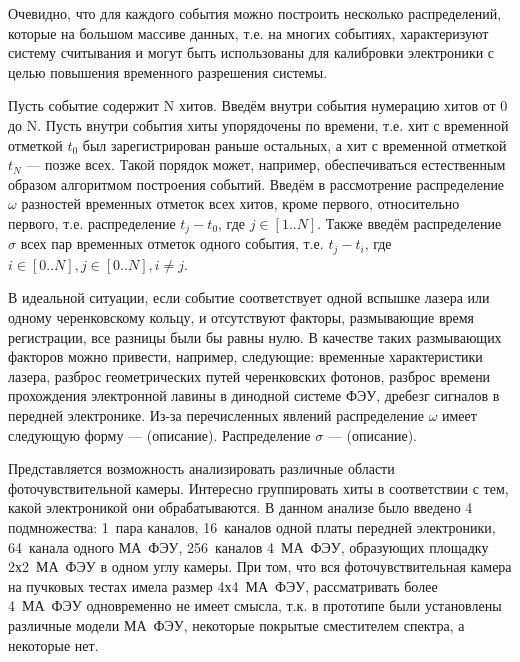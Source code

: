 Очевидно, что для каждого события можно построить несколько распределений, которые на большом массиве данных, т.е. на многих событиях, характеризуют систему считывания и могут быть использованы для калибровки электроники с целью повышения временного разрешения системы.

Пусть событие содержит N хитов. Введём внутри события нумерацию хитов от 0 до N. Пусть внутри события хиты упорядочены по времени, т.е. хит с временной отметкой $ t_{0} $ был зарегистрирован раньше остальных, а хит с временной отметкой $ t_{N} $ --- позже всех. Такой порядок может, например, обеспечиваться естественным образом алгоритмом построения событий. Введём в рассмотрение распределение $ \omega $ разностей временных отметок всех хитов, кроме первого, относительно первого, т.е. распределение $ t_{j} - t_{0} $, где  $ j \in [1..N] $. Также введём распределение $ \sigma $ всех пар временных отметок одного события, т.е. $ t_{j}-t_{i} $, где $ i \in [0..N], j \in [0..N], i \neq j $.

В идеальной ситуации, если событие соответствует одной вспышке лазера или одному черенковскому кольцу, и отсутствуют факторы, размывающие время регистрации, все разницы были бы равны нулю. В качестве таких размывающих факторов можно привести, например, следующие: временные характеристики лазера, разброс геометрических путей черенковских фотонов, разброс времени прохождения электронной лавины в динодной системе ФЭУ, дребезг сигналов в передней электронике. Из-за перечисленных явлений распределение $ \omega $ имеет следующую форму --- (описание). Распределение $ \sigma $ --- (описание).


Представляется возможность анализировать различные области фоточувствительной камеры. Интересно группировать хиты в соответствии с тем, какой электроникой они обрабатываются. В данном анализе было введено 4 подмножества: 1~пара каналов, 16~каналов одной платы передней электроники, 64~канала одного МА~ФЭУ, 256~каналов 4~МА~ФЭУ, образующих площадку 2х2~МА~ФЭУ в одном углу камеры. При том, что вся фоточувствительная камера на пучковых тестах имела размер 4х4~МА~ФЭУ, рассматривать более 4~МА~ФЭУ одновременно не имеет смысла, т.к. в прототипе были установлены различные модели МА~ФЭУ, некоторые покрытые сместителем спектра, а некоторые нет.


